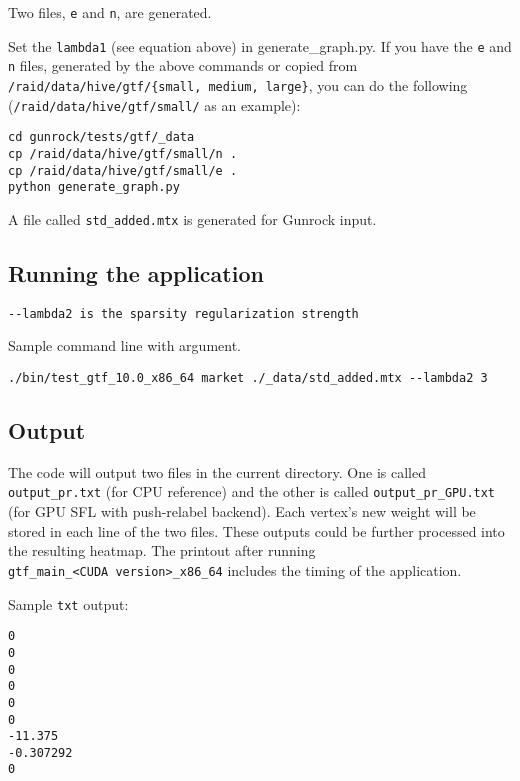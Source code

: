 \documentclass[10pt,oneside]{memoir}
\begin{document}
Two files, \texttt{e} and \texttt{n}, are generated.

Set the \texttt{lambda1} (see equation above) in generate\_graph.py. If
you have the \texttt{e} and \texttt{n} files, generated by the above
commands or copied from
\texttt{/raid/data/hive/gtf/\{small,\ medium,\ large\}}, you can do the
following (\texttt{/raid/data/hive/gtf/small/} as an example):

\begin{verbatim}
cd gunrock/tests/gtf/_data
cp /raid/data/hive/gtf/small/n .
cp /raid/data/hive/gtf/small/e .
python generate_graph.py
\end{verbatim}

A file called \texttt{std\_added.mtx} is generated for Gunrock input.

\hypertarget{running-the-application-7}{%
\subsection{Running the application}\label{running-the-application-7}}

\begin{verbatim}
--lambda2 is the sparsity regularization strength
\end{verbatim}

Sample command line with argument.

\begin{verbatim}
./bin/test_gtf_10.0_x86_64 market ./_data/std_added.mtx --lambda2 3
\end{verbatim}

\hypertarget{output-4}{%
\subsection{Output}\label{output-4}}

The code will output two files in the current directory. One is called
\texttt{output\_pr.txt} (for CPU reference) and the other is called
\texttt{output\_pr\_GPU.txt} (for GPU SFL with push-relabel backend).
Each vertex's new weight will be stored in each line of the two files.
These outputs could be further processed into the resulting heatmap. The
printout after running
\texttt{gtf\_main\_\textless{}CUDA\ version\textgreater{}\_x86\_64}
includes the timing of the application.

Sample \texttt{txt} output:

\begin{verbatim}
0
0
0
0
0
0
-11.375
-0.307292
0
\end{verbatim}
\end{document}
